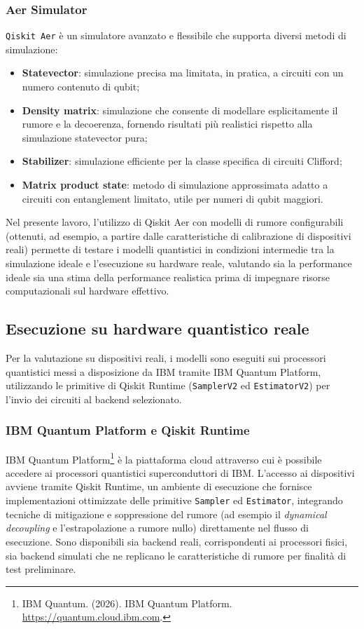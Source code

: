 \subsubsection{Aer Simulator}
\texttt{Qiskit Aer} è un simulatore avanzato e flessibile che supporta diversi metodi di simulazione:
\begin{itemize}
    \item \textbf{Statevector}: simulazione precisa ma limitata, in pratica, a circuiti con un numero contenuto di qubit;
    \item \textbf{Density matrix}: simulazione che consente di modellare esplicitamente il rumore e la decoerenza, fornendo risultati più realistici rispetto alla simulazione statevector pura;
    \item \textbf{Stabilizer}: simulazione efficiente per la classe specifica di circuiti Clifford;
    \item \textbf{Matrix product state}: metodo di simulazione approssimata adatto a circuiti con entanglement limitato, utile per numeri di qubit maggiori.
\end{itemize}

Nel presente lavoro, l'utilizzo di Qiskit Aer con modelli di rumore configurabili (ottenuti, ad esempio, a partire dalle caratteristiche di calibrazione di dispositivi reali) permette di testare i modelli quantistici in condizioni intermedie tra la simulazione ideale e l'esecuzione su hardware reale, valutando sia la performance ideale sia una stima della performance realistica prima di impegnare risorse computazionali sul hardware effettivo.

\subsection{Esecuzione su hardware quantistico reale}
\label{sec:esecuzione_hardware_reale}

Per la valutazione su dispositivi reali, i modelli sono eseguiti sui processori quantistici messi a disposizione da IBM tramite IBM Quantum Platform, utilizzando le primitive di Qiskit Runtime (\texttt{SamplerV2} ed \texttt{EstimatorV2}) per l'invio dei circuiti al backend selezionato.

\subsubsection{IBM Quantum Platform e Qiskit Runtime}
IBM Quantum Platform\footnote{IBM Quantum. (2026). IBM Quantum Platform. \url{https://quantum.cloud.ibm.com}.} è la piattaforma cloud attraverso cui è possibile accedere ai processori quantistici superconduttori di IBM. L'accesso ai dispositivi avviene tramite Qiskit Runtime, un ambiente di esecuzione che fornisce implementazioni ottimizzate delle primitive \texttt{Sampler} ed \texttt{Estimator}, integrando tecniche di mitigazione e soppressione del rumore (ad esempio il \textit{dynamical decoupling} e l'estrapolazione a rumore nullo) direttamente nel flusso di esecuzione. Sono disponibili sia backend reali, corrispondenti ai processori fisici, sia backend simulati che ne replicano le caratteristiche di rumore per finalità di test preliminare.

